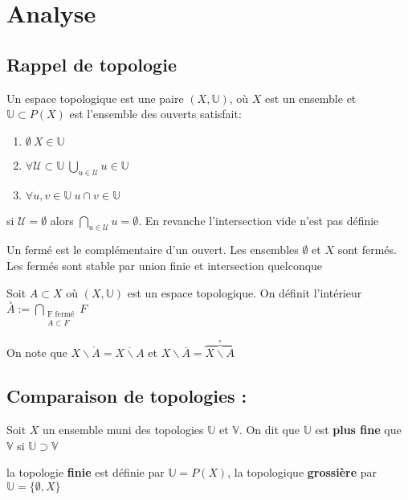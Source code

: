 \section{Analyse}
\subsection{ Rappel de topologie }
Un espace topologique est une paire $(X, \mathbb{U})$, où $X$ est un ensemble et \\$\mathbb{U}\subset P(X)$ est l'ensemble des ouverts satisfait:\\
        \begin{enumerate}
            \item $\emptyset \ X\in \mathbb{U}$
            \item $\forall \mathcal{U}\subset \mathbb{U}\ \bigcup_{u\in \mathcal{U}} u\in \mathbb{U}$
            \item $\forall u,v\in \mathbb{U}\ u \cap v \in \mathbb{U}$
            \end{enumerate}
\begin{remarque}
si $\mathcal{U}=\emptyset $ alors $\bigcap\limits_{u\in \mathcal{U}} u = \emptyset $. En revanche l'intersection vide n'est pas définie
\end{remarque}
\begin{remarque}
Un fermé est le complémentaire d'un ouvert. Les ensembles $\emptyset$ et $X$ sont fermés. Les fermés sont stable par union finie et intersection quelconque
\end{remarque}

\begin{definition}
Soit $A\subset X$ où $(X,\mathbb{U})$ est un espace topologique. On définit l'intérieur $\overset{\circ}{A}:=\bigcap\limits_{\substack{\text{F fermé}\\ A\subset F}}F$
\end{definition}
On note que $X\backslash\mathring{A}=\overline{X\backslash A}$ et $X\backslash\overline{A} =\overbrace{X\backslash A}^{\circ}$

\subsection{Comparaison de topologies :}
\begin{definition}
    Soit $X$ un ensemble muni des topologies $\mathbb{U}$ et $\mathbb{V}$. On dit que $\mathbb{U}$ est \textbf{plus fine} que $\mathbb{V}$ si $\mathbb{U}\supset\mathbb{V}$
\end{definition}
\begin{ex}
    la topologie \textbf{finie} est définie par $\mathbb{U}=P(X)$, la topologique \textbf{grossière} par $\mathbb{U}=\{\emptyset, X\}$
\end{ex}

